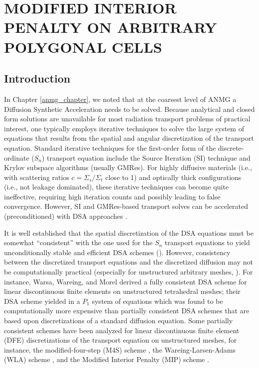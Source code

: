 \chapter{\uppercase{Modified Interior Penalty on Arbitrary Polygonal Cells}}
\label{mip_chapter}
\section{Introduction}
In Chapter \ref{anmg_chapter}, we noted that at the coarsest level of ANMG 
a Diffusion Synthetic Acceleration needs to be solved. 
Because analytical and closed form solutions are unavailable for most
radiation transport problems of practical interest, one typically employs
iterative techniques to solve the large system of equations that results from
the spatial and angular discretization of the transport equation. Standard
iterative techniques for the first-order form of the discrete-ordinate ($S_n$)
transport equation include the Source Iteration (SI) technique and Krylov 
subspace algorithms (usually GMRes). For highly diffusive materials (i.e., 
with scattering ratios $c=\Sigma_s / \Sigma_t $ close to 1) and optically 
thick configurations (i.e., not leakage dominated), these iterative techniques 
can become quite ineffective, requiring high iteration counts and possibly 
leading to false convergence. However, SI and GMRes-based transport solves 
can be accelerated (preconditioned) with DSA approaches 
\cite{dsa_ref,larsen_dsa,consistent_p1,m4s,wla,mip}. 

It is well established that the spatial discretization of the DSA equations
must be somewhat ``consistent'' with the one used for the $S_n$ transport equations to
yield unconditionally stable and efficient DSA schemes
(\cite{dsa_ref,larsen_dsa,consistent_p1,m4s,wla,mip}). However, 
consistency between the discretized transport equations and the discretized
diffusion may not be computationally practical (especially for unstructured
arbitrary meshes, \cite{dsa_ref}). For instance, Warsa, Wareing, and
Morel \cite{consistent_p1} derived a fully consistent DSA scheme for linear
discontinuous finite elements on unstructured tetrahedral meshes; their DSA
scheme yielded in a $P_1$ system of equations which was found to be
computationally more expensive than partially consistent DSA schemes that are
based upon discretizations of a standard diffusion equation. Some partially 
consistent schemes have been analyzed for linear discontinuous finite element
(DFE) discretizations of the transport equation on unstructured meshes, for
instance, the modified-four-step (M4S) scheme \cite{m4s}, the
Wareing-Larsen-Adams (WLA) scheme \cite{wla,wla_pwl}, and the Modified Interior
Penalty (MIP) scheme \cite{mip}.

